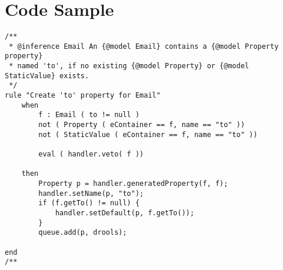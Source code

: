 \chapter{Code Sample}

\begin{verbatim}
/**
 * @inference Email An {@model Email} contains a {@model Property property} 
 * named 'to', if no existing {@model Property} or {@model StaticValue} exists.
 */
rule "Create 'to' property for Email"
	when
		f : Email ( to != null )
		not ( Property ( eContainer == f, name == "to" ))
		not ( StaticValue ( eContainer == f, name == "to" ))
		
		eval ( handler.veto( f ))
			
	then
		Property p = handler.generatedProperty(f, f);
		handler.setName(p, "to");
		if (f.getTo() != null) {
			handler.setDefault(p, f.getTo());
		}
		queue.add(p, drools);
		
end
/**\end{verbatim}

